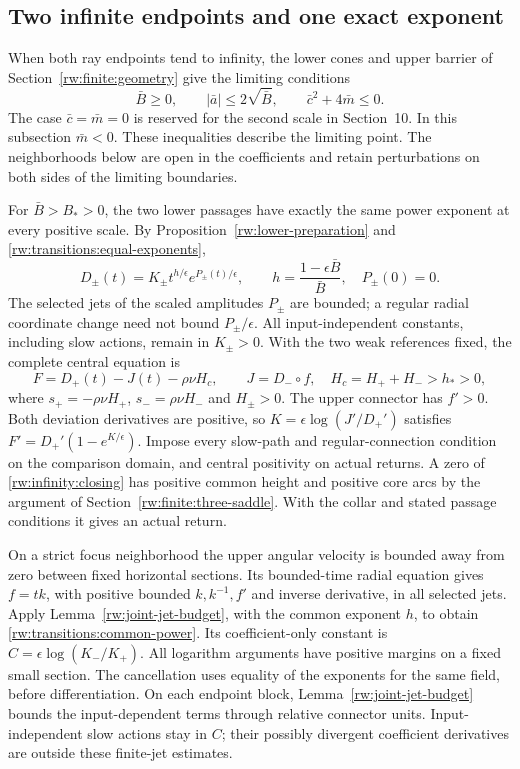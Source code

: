 \subsection{Two infinite endpoints and one exact exponent}
\label{rw:infinity:two-infinite}

When both ray endpoints tend to infinity, the lower cones and upper
barrier of Section~\ref{rw:finite:geometry} give the limiting conditions
\[
 \bar B\ge0,\qquad |\bar a|\le2\sqrt{\bar B},\qquad
 \bar c^2+4\bar m\le0.
\]
The case $\bar c=\bar m=0$ is reserved for the second scale in
Section~10. In this subsection $\bar m<0$. These inequalities describe
the limiting point. The neighborhoods below are open in the coefficients and retain perturbations on both
sides of the limiting boundaries.

For $\bar B>B_*>0$, the two lower passages have exactly the same
power exponent at every positive scale. By
Proposition~\ref{rw:lower-preparation} and
\eqref{rw:transitions:equal-exponents},
\begin{equation}\label{rw:infinity:horizontal-powers}
 D_\pm(t)=K_\pm t^{h/\epsilon}e^{P_\pm(t)/\epsilon},\qquad
 h=\frac{1-\epsilon\bar B}{\bar B},\quad P_\pm(0)=0.
\end{equation}
The selected jets of the scaled amplitudes $P_\pm$ are bounded;
a regular radial coordinate change need not bound $P_\pm/\epsilon$.
All input-independent constants, including slow actions, remain in
$K_\pm>0$. With the two weak references fixed, the complete central
equation is
\begin{equation}\label{rw:infinity:closing}
 F=D_+(t)-J(t)-\rho\nu H_c,\qquad J=D_-\circ f,
 \quad H_c=H_++H_->h_*>0,
\end{equation}
where $s_+=-\rho\nu H_+$, $s_-=\rho\nu H_-$ and $H_\pm>0$.
The upper connector has $f'>0$. Both deviation derivatives are positive,
so $K=\epsilon\log(J'/D_+')$ satisfies
$F'=D_+'(1-e^{K/\epsilon})$. Impose every slow-path and
regular-connection condition on the comparison domain, and central
positivity on actual returns. A zero of \eqref{rw:infinity:closing} has
positive common height and positive core arcs by the argument of
Section~\ref{rw:finite:three-saddle}. With the collar and stated
passage conditions it gives an actual return.

On a strict focus neighborhood the upper angular velocity is bounded
away from zero between fixed horizontal sections. Its bounded-time
radial equation gives $f=tk$, with positive bounded $k,k^{-1},f'$
and inverse derivative, in all selected jets. Apply
Lemma~\ref{rw:joint-jet-budget}, with the common exponent
$h$, to obtain \eqref{rw:transitions:common-power}. Its coefficient-only
constant is $C=\epsilon\log(K_-/K_+)$.
All logarithm arguments have positive margins on a fixed small
section. The cancellation uses equality of the exponents for the same
field, before differentiation. On each endpoint block,
Lemma~\ref{rw:joint-jet-budget} bounds the input-dependent terms
through relative connector units. Input-independent slow actions stay
in $C$; their possibly divergent coefficient derivatives are outside
these finite-jet estimates.

